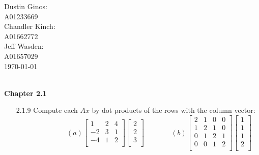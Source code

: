 \documentclass[10pt,twoside,reqno]{article}
\begin{document}
\begin{flushright}
\begin{minipage}{.25\textwidth}
Dustin Ginos: \\
A01233669\\
Chandler Kinch: \\
A01662772\\
Jeff Wasden: \\
A01657029\\

\today
\end{minipage}
\end{flushright}

\\
\vspace{5mm}
\textbf{Chapter 2.1}
\begin{enumerate}
\item[2.1.9]Compute each $Ax$ by dot products of the rows with the column vector: \\
\vspace{3mm}
$
$$
\hspace{85pt}
(a) 
\begin{bmatrix}
1&2&4\\
-2&3&1\\
-4&1&2\\
\end{bmatrix}
\begin{bmatrix}
2\\
2\\
3\\
\end{bmatrix}
\hspace{45pt}
(b) 
\begin{bmatrix}
2&1&0&0\\
1&2&1&0\\
0&1&2&1\\
0&0&1&2\\
\end{bmatrix}
\begin{bmatrix}
1\\
1\\
1\\
2\\
\end{bmatrix}
$$
$\\
\vspace{3mm}


\end{enumerate}
\end{document}
